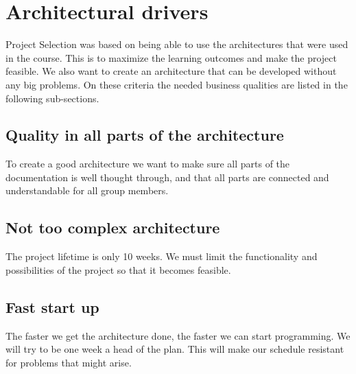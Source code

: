 \section{Architectural drivers}

Project Selection was based on being able to use the architectures that were used in the course. This is to maximize the learning outcomes and make the project feasible. We also want to create an architecture that can be developed without any big problems. On these criteria the needed business qualities are listed in the following sub-sections.

\subsection{Quality in all parts of the architecture}
To create a good architecture we want to make sure all parts of the documentation is well thought through, and that all parts are connected and understandable for all group members.

\subsection{Not too complex architecture}
The project lifetime is only 10 weeks. We must limit the functionality and possibilities of the project so that it becomes feasible.

\subsection{Fast start up}
The faster we get the architecture done, the faster we can start programming. We will try to be one week a head of the plan. This will make our schedule resistant for problems that might arise.




